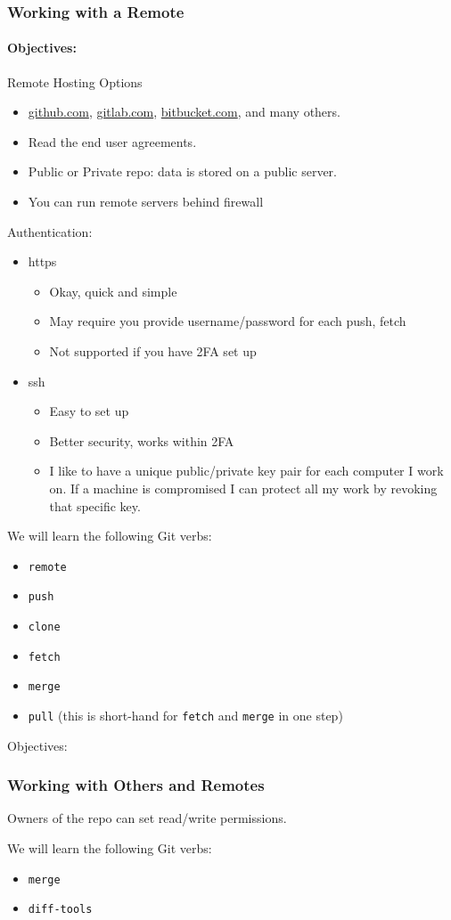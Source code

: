 \begin{frame}[t]
  \frametitle{Working with a Remote}
  \framesubtitle{Objectives:}
  Remote Hosting Options
  \begin{itemize}
    \item \url{github.com}, \url{gitlab.com}, \url{bitbucket.com}, and many others.
    \item Read the end user agreements. 
    \item Public or Private repo: data is stored on a public server.
    \item You can run remote servers behind firewall
  \end{itemize}

  Authentication:
  \begin{itemize}
    \item https
      \begin{itemize}
        \item Okay, quick and simple
        \item May require you provide username/password for each push, fetch
        \item Not supported if you have 2FA set up
      \end{itemize}
    \item ssh
      \begin{itemize}
        \item Easy to set up
        \item Better security, works within 2FA
        \item I like to have a unique public/private key pair for each computer I work on.  If a
          machine is compromised I can protect all my work by revoking that
          specific key.
      \end{itemize}
  \end{itemize}

  We will learn the following Git verbs:
  \begin{itemize}
    \item {\tt remote}
    \item {\tt push}
    \item {\tt clone}
    \item {\tt fetch}
    \item {\tt merge}
    \item {\tt pull} (this is short-hand for {\tt fetch} and {\tt merge} in one
      step)
  \end{itemize} 
\end{frame}

\begin{frame}[t]{Objectives:}
  \frametitle{Working with Others and Remotes}
  Owners of the repo can set read/write permissions.

  We will learn the following Git verbs:
  \begin{itemize}
    \item {\tt merge}
    \item {\tt diff-tools}
  \end{itemize} 
\end{frame}

